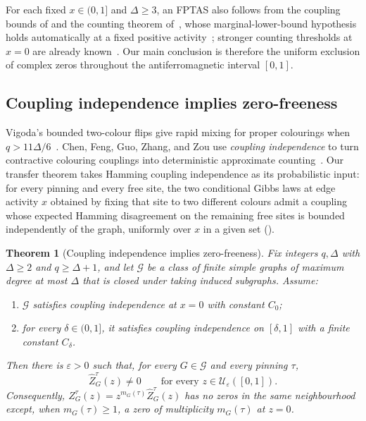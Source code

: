 \documentclass[11pt,reqno]{article}
\theoremstyle{plain}
\newtheorem{theorem}{Theorem}[section]
\theoremstyle{definition}
\theoremstyle{remark}
\theoremstyle{definition}
\theoremstyle{remark}
\newcommand{\eps}{\varepsilon}
\newcommand{\Deg}{\Delta}                        %
\newcommand{\Zpin}[2]{Z_{#1}^{#2}}
\newcommand{\nZpin}[2]{\widehat Z_{#1}^{#2}}
\begin{document}
For each fixed
\(x\in(0,1]\) and \(\Deg\ge3\), an FPTAS also follows from the coupling
bounds of
 and the counting theorem
of~\cite[Theorem~4]{CFFGZZ2024}, whose marginal-lower-bound hypothesis
holds automatically at a fixed positive
activity~\cite[Observation~10]{CFFGZZ2024};
stronger counting thresholds at \(x=0\) are already
known~\cite{CFFGZZ2024}.  Our main conclusion is therefore the uniform
exclusion of complex zeros throughout the antiferromagnetic interval
\([0,1]\).

\subsection{Coupling independence implies zero-freeness}
\label{sec:intro-transfer}

Vigoda's bounded two-colour flips give rapid mixing for proper
colourings when \(q>11\Deg/6\)~\cite{Vigoda2000}.
Chen, Feng, Guo, Zhang, and Zou use \emph{coupling independence}
to turn contractive colouring couplings into deterministic approximate
counting~\cite{CFFGZZ2024}.  Our transfer theorem takes Hamming coupling
independence as its probabilistic input: for every pinning and every free
site, the two conditional Gibbs laws at edge activity \(x\) obtained by
fixing that site to two different colours admit a coupling whose expected
Hamming disagreement on the remaining free sites is bounded independently
of the graph, uniformly over \(x\) in a given set ().

\begin{theorem}[Coupling independence implies zero-freeness]
\label{thm:potts-transfer}
Fix integers \(q,\Deg\) with \(\Deg\ge2\) and \(q\ge\Deg+1\), and let
\(\mathcal G\) be a class of finite simple graphs of maximum degree at
most \(\Deg\) that is closed under taking induced subgraphs.  Assume:
\begin{enumerate}[label=\textup{(\roman*)}]
  \item \(\mathcal G\) satisfies coupling independence at \(x=0\) with
        constant \(C_0\);
  \item for every \(\delta\in(0,1]\), it satisfies coupling independence
        on \([\delta,1]\) with a finite constant \(C_\delta\).
\end{enumerate}
Then there is \(\eps>0\) such that, for every \(G\in\mathcal G\) and every
pinning \(\tau\),
\[
  \nZpin{G}{\tau}(z)\ne0
  \qquad\text{for every }z\in\mathcal U_\eps([0,1]).
\]
Consequently, \(\Zpin{G}{\tau}(z)=z^{m_G(\tau)}\nZpin{G}{\tau}(z)\) has
no zeros in the same neighbourhood except, when \(m_G(\tau)\ge1\), a zero
of multiplicity \(m_G(\tau)\) at \(z=0\).
\end{theorem}
\end{document}
